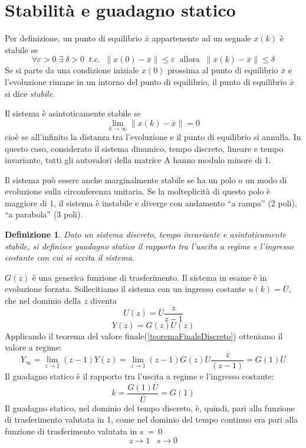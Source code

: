 \documentclass[a4paper]{report}
\newtheorem{definizione}{Definizione}
\begin{document}
\section{Stabilit\`a e guadagno statico}
Per definizione, un punto di equilibrio $\bar{x}$ appartenente ad un
segnale $x(k)$ \`e stabile se
\begin{equation}
  \forall \varepsilon > 0 \; \exists \;\delta > 0 \;\;t.c. \;\; \parallel x(0) -
  \bar{x} \parallel \leq \varepsilon \;\; \textrm{allora} \;\;
  \parallel x(k) - \bar{x} \parallel \leq \delta
\end{equation}
Se si parte da una condizione iniziale $x(0)$ prossima al punto di
equilibrio $\bar{x}$ e l'evoluzione rimane in un intorno del punto
di equilibrio, il punto di equilibrio $\bar{x}$ si dice {\em stabile}.

Il sistema \`e asintoticamente stabile se
\[
\lim_{k \to \infty} \parallel x(k) - \bar{x} \parallel = 0
\]
cio\`e se all'infinito la distanza tra l'evoluzione e il punto di
equilibrio si annulla. In questo caso, considerato il sistema dinamico,
tempo discreto, lineare e tempo invariante, tutti gli autovalori della
matrice A hanno modulo minore di 1.

Il sistema pu\`o essere anche marginalmente stabile se ha un polo o un
modo di evoluzione sulla circonferenza unitaria. Se la molteplicit\`a
di questo polo \`e maggiore di 1, il sistema \`e instabile e diverge
con andamento ``a rampa'' (2 poli), ``a parabola'' (3 poli).

\begin{definizione}
  Dato un sistema discreto, tempo invariante e asintoticamente stabile,
  si definisce {\em guadagno statico} il
  rapporto tra l'uscita a regime e l'ingresso costante con cui si eccita
  il sistema.
\end{definizione}
$G(z)$ \`e una generica funzione di trasferimento. Il sistema in esame
\`e in evoluzione forzata. Sollecitiamo il sistema con un ingresso
costante $u(k) = \overline{U}$, che nel dominio della $z$ diventa
\[
U(z) = \overline{U}\dfrac{z}{z - 1}
\]
\[
Y(z) = G(z) U(z)
\]
Applicando il teorema del valore finale(\ref{teoremaFinaleDiscreto})
otteniamo il valore a regime:
\[
Y_{\infty} = \lim_{z \to 1} (z - 1)Y(z) = \lim_{z \to 1} (z - 1) G(z)
\overline{U}\dfrac{z}{(z - 1)} = G(1)\overline{U}
\]
Il guadagno statico \`e il rapporto tra l'uscita a regime e l'ingresso
costante:
\[
k = \dfrac{G(1) \overline{U}}{\overline{U}} = G(1)
\]
Il guadagno statico, nel dominio del tempo discreto, \`e, quindi, pari
alla funzione di trasferimento valutata in 1, come nel dominio del
tempo continuo era pari alla funzione di trasferimento valutata in
$s~=~0$
\[
z \to 1 \;\;\; s \to 0
\]
\end{document}
